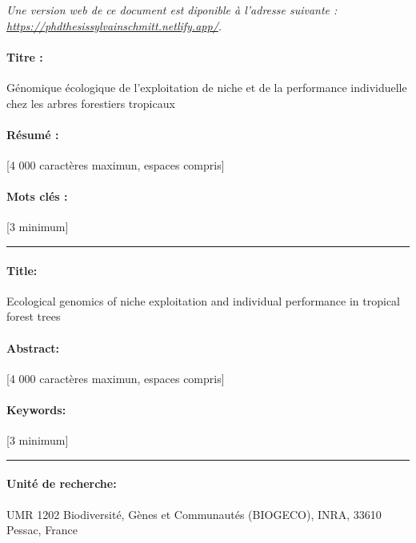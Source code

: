 \newpage
\vspace*{\fill}
\emph{Une version web de ce document est diponible à l'adresse suivante : \url{https://phdthesissylvainschmitt.netlify.app/}.}
\newpage
\newpage
\normalsize{
\paragraph{Titre :}
Génomique écologique de l'exploitation de niche et de la performance individuelle chez les arbres forestiers tropicaux
\paragraph{Résumé :}
[4 000 caractères maximun, espaces compris]
\paragraph{Mots clés :}
[3 minimum]
\vspace*{\fill}
\newline\noindent\rule{\textwidth}{1pt}
\paragraph{Title:} 
Ecological genomics of niche exploitation and individual performance in tropical forest trees
\paragraph{Abstract:}
[4 000 caractères maximun, espaces compris]
\paragraph{Keywords:} 
[3 minimum]
\vspace*{\fill}
\newline\noindent\rule{\textwidth}{1pt}
\paragraph{Unité de recherche:} UMR 1202 Biodiversité, Gènes et Communautés (BIOGECO), INRA, 33610 Pessac, France
}